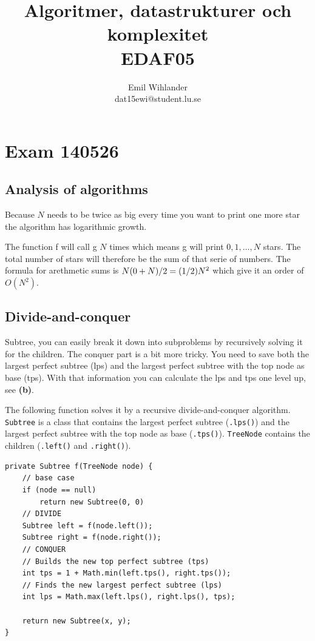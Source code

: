 \documentclass[a4paper]{article}
\title{Algoritmer, datastrukturer och komplexitet\\ EDAF05}
\author{Emil Wihlander\\ dat15ewi@student.lu.se}
\newenvironment{task}[1]
{
	\begin{description}[align=right]
		\item [#1]
}{		%
	\end{description}
}
\newcommand{\taskref}[1]{\textbf{#1}}
\let\*\relax
\DeclareMathOperator{\*}{\cdot}
\begin{document}
 
\maketitle

\section*{Exam 140526}
\subsection*{Analysis of algorithms}

\begin{task}{1. (a)}
	 Because $N$ needs to be twice as big every time you want to print one more star the algorithm has logarithmic growth.
\end{task}

\begin{task}{(b)}
	 The function f will call g $N$ times which means g will print $0, 1, \ldots, N$ stars. The total number of stars will therefore be the sum of that serie of numbers. The formula for arethmetic sums is $N\*(0+N)/2=(1/2)\*N^2$ which give it an order of $O(N^2)$.
\end{task}

\subsection*{Divide-and-conquer}

\begin{task}{2. (a)}
	 Subtree, you can easily break it down into subproblems by recursively solving it for the children. The conquer part is a bit more tricky. You need to save both the largest perfect subtree (lps) and the largest perfect subtree with the top node as base (tps). With that information you can calculate the lps and tps one level up, see \taskref{(b)}. 
\end{task}

\begin{task}{(b)}
	\qquad The following function solves it by a recursive divide-and-conquer algorithm. \texttt{Subtree} is a class that contains the largest perfect subtree (\texttt{.lps()}) and the largest perfect subtree with the top node as base (\texttt{.tps()}). \texttt{TreeNode} contains the children (\texttt{.left()} and \texttt{.right()}).
\begin{lstlisting}
private Subtree f(TreeNode node) {
	// base case
	if (node == null) 
		return new Subtree(0, 0)
	// DIVIDE
	Subtree left = f(node.left());
	Subtree right = f(node.right());
	// CONQUER
	// Builds the new top perfect subtree (tps)
	int tps = 1 + Math.min(left.tps(), right.tps());
	// Finds the new largest perfect subtree (lps)
	int lps = Math.max(left.lps(), right.lps(), tps);
	
	return new Subtree(x, y);
}
\end{lstlisting}
\end{task}
\end{document}
